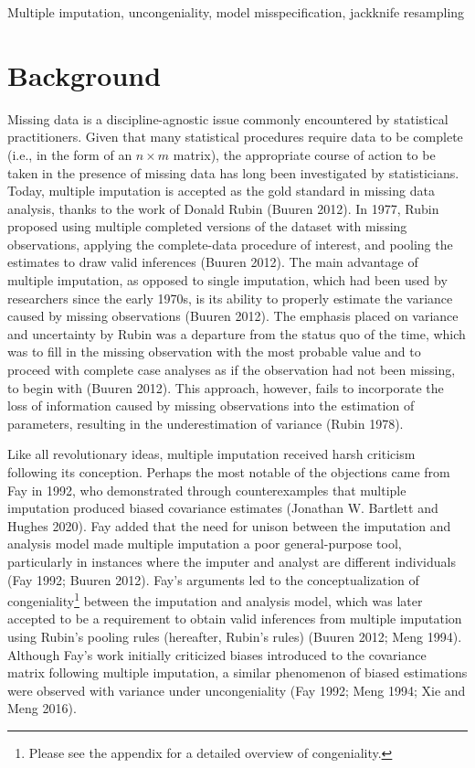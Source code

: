 \documentclass[
  letterpaper,
  DIV=11,
  numbers=noendperiod]{scrreprt}
\begin{document}
Multiple imputation, uncongeniality, model misspecification, jackknife
resampling


\hypertarget{background}{%
\chapter{Background}\label{background}}

Missing data is a discipline-agnostic issue commonly encountered by
statistical practitioners. Given that many statistical procedures
require data to be complete (i.e., in the form of an \(n \times m\)
matrix), the appropriate course of action to be taken in the presence of
missing data has long been investigated by statisticians. Today,
multiple imputation is accepted as the gold standard in missing data
analysis, thanks to the work of Donald Rubin (Buuren 2012). In 1977,
Rubin proposed using multiple completed versions of the dataset with
missing observations, applying the complete-data procedure of interest,
and pooling the estimates to draw valid inferences (Buuren 2012). The
main advantage of multiple imputation, as opposed to single imputation,
which had been used by researchers since the early 1970s, is its ability
to properly estimate the variance caused by missing observations (Buuren
2012). The emphasis placed on variance and uncertainty by Rubin was a
departure from the status quo of the time, which was to fill in the
missing observation with the most probable value and to proceed with
complete case analyses as if the observation had not been missing, to
begin with (Buuren 2012). This approach, however, fails to incorporate
the loss of information caused by missing observations into the
estimation of parameters, resulting in the underestimation of variance
(Rubin 1978).

Like all revolutionary ideas, multiple imputation received harsh
criticism following its conception. Perhaps the most notable of the
objections came from Fay in 1992, who demonstrated through
counterexamples that multiple imputation produced biased covariance
estimates (Jonathan W. Bartlett and Hughes 2020). Fay added that the
need for unison between the imputation and analysis model made multiple
imputation a poor general-purpose tool, particularly in instances where
the imputer and analyst are different individuals (Fay 1992; Buuren
2012). Fay's arguments led to the conceptualization of
congeniality\footnote{Please see the appendix for a detailed overview of
  congeniality.} between the imputation and analysis model, which was
later accepted to be a requirement to obtain valid inferences from
multiple imputation using Rubin's pooling rules (hereafter, Rubin's
rules) (Buuren 2012; Meng 1994). Although Fay's work initially
criticized biases introduced to the covariance matrix following multiple
imputation, a similar phenomenon of biased estimations were observed
with variance under uncongeniality (Fay 1992; Meng 1994; Xie and Meng
2016).
\end{document}
